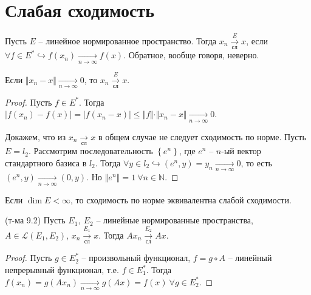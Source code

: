 \section{Слабая сходимость}
\begin{definition}
Пусть $\displaystyle E$ -- линейное нормированное пространство. Тогда $\displaystyle x_{n}\xrightarrow[\text{сл}]{E} x$, если $\displaystyle \forall f\in E^{*} \hookrightarrow f( x_{n})\xrightarrow[n\rightarrow \infty ]{} f( x)$. Обратное, вообще говоря, неверно.
\end{definition}
\begin{proposition}
Если $\displaystyle \Vert x_{n} -x\Vert \xrightarrow[n\rightarrow \infty ]{} 0$, то $\displaystyle x_{n}\xrightarrow[\text{сл}]{E} x$.
\end{proposition}
\begin{proof}
Пусть $\displaystyle f\in E^{*}$. Тогда $\displaystyle | f( x_{n}) -f( x)| =| f( x_{n} -x)| \leqslant \Vert f\Vert \cdotp \Vert x_{n} -x\Vert \xrightarrow[n\rightarrow \infty ]{} 0$.

Докажем, что из $\displaystyle x_{n}\xrightarrow[\text{сл}]{} x$ в общем случае не следует сходимость по норме. Пусть $\displaystyle E=l_{2}$. Рассмотрим последовательность $\displaystyle \left\{e^{n}\right\}$, где $\displaystyle e^{n}$ -- $\displaystyle n$-ый вектор стандартного базиса в $\displaystyle l_{2}$. Тогда $\displaystyle \forall y\in l_{2} \hookrightarrow \left( e^{n} ,y\right) =y_{n}\xrightarrow[n\rightarrow \infty ]{} 0$, то есть $\displaystyle \left( e^{n} ,y\right)\xrightarrow[n\rightarrow \infty ]{}( 0,y)$. Но $\displaystyle \left\Vert e^{n}\right\Vert =1\ \forall n\in \mathbb{N}$.
\end{proof}
\begin{note}
Если $\displaystyle \dim E< \infty $, то сходимость по норме эквивалентна слабой сходимости.
\end{note}
\begin{theorem}
(т-ма 9.2) Пусть $\displaystyle E_{1} ,\ E_{2}$ -- линейные нормированные пространства, $\displaystyle A\in \mathcal{L}( E_{1} ,E_{2})$, $\displaystyle x_{n}\xrightarrow[\text{сл}]{E_{1}} x$. Тогда $\displaystyle Ax_{n}\xrightarrow[\text{сл}]{E_{2}} Ax$.
\end{theorem}
\begin{proof}
Пусть $\displaystyle g\in E_{2}^{*}$ -- произвольный функционал, $\displaystyle f=g\circ A$ -- линейный непрерывный функционал, т.е. $\displaystyle f\in E_{1}^{*}$. Тогда $\displaystyle f( x_{n}) =g( Ax_{n})\xrightarrow[n\rightarrow \infty ]{} g( Ax) =f( x) \ \forall g\in E_{2}^{*}$.
\end{proof}